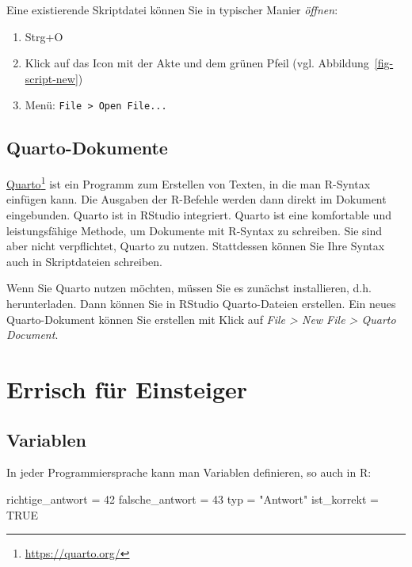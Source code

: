 \documentclass[
  letterpaper,
  twoside,
  open=any]{scrbook}
\newenvironment{Shaded}{\begin{snugshade}}{\end{snugshade}}
\newcommand{\ConstantTok}[1]{\textcolor[rgb]{0.56,0.35,0.01}{#1}}
\newcommand{\DecValTok}[1]{\textcolor[rgb]{0.68,0.00,0.00}{#1}}
\newcommand{\NormalTok}[1]{\textcolor[rgb]{0.00,0.23,0.31}{#1}}
\newcommand{\OtherTok}[1]{\textcolor[rgb]{0.00,0.23,0.31}{#1}}
\newcommand{\StringTok}[1]{\textcolor[rgb]{0.13,0.47,0.30}{#1}}
\providecommand{\tightlist}{%
  \setlength{\itemsep}{0pt}\setlength{\parskip}{0pt}}\usepackage{longtable,booktabs,array}
\theoremstyle{definition}
\theoremstyle{definition}
\theoremstyle{definition}
\theoremstyle{remark}
\begin{document}
Eine existierende Skriptdatei können Sie in typischer Manier
\emph{öffnen}:

\begin{enumerate}
\def\labelenumi{\arabic{enumi}.}
\tightlist
\item
  Strg+O
\item
  Klick auf das Icon mit der Akte und dem grünen Pfeil (vgl.
  Abbildung~\ref{fig-script-new})
\item
  Menü: \texttt{File\ \textgreater{}\ Open\ File...}
\end{enumerate}

\subsection{Quarto-Dokumente}\label{quarto-dokumente}

\href{https://quarto.org/}{Quarto}\footnote{\url{https://quarto.org/}}
ist ein Programm zum Erstellen von Texten, in die man R-Syntax einfügen
kann. Die Ausgaben der R-Befehle werden dann direkt im Dokument
eingebunden. Quarto ist in RStudio integriert. Quarto ist eine
komfortable und leistungsfähige Methode, um Dokumente mit R-Syntax zu
schreiben. Sie sind aber nicht verpflichtet, Quarto zu nutzen.
Stattdessen können Sie Ihre Syntax auch in Skriptdateien schreiben.

Wenn Sie Quarto nutzen möchten, müssen Sie es zunächst installieren,
d.h. herunterladen. Dann können Sie in RStudio Quarto-Dateien erstellen.
Ein neues Quarto-Dokument können Sie erstellen mit Klick auf \emph{File
\textgreater{} New File \textgreater{} Quarto Document}.

\section{Errisch für Einsteiger}\label{errisch-fuxfcr-einsteiger}

\subsection{Variablen}\label{sec-rvars}

In jeder Programmiersprache kann man Variablen definieren, so auch in R:

\begin{Shaded}
\begin{Highlighting}[]
\NormalTok{richtige\_antwort }\OtherTok{=} \DecValTok{42}
\NormalTok{falsche\_antwort }\OtherTok{=} \DecValTok{43}
\NormalTok{typ }\OtherTok{=} \StringTok{"Antwort"}
\NormalTok{ist\_korrekt }\OtherTok{=} \ConstantTok{TRUE}
\end{Highlighting}
\end{Shaded}
\end{document}
